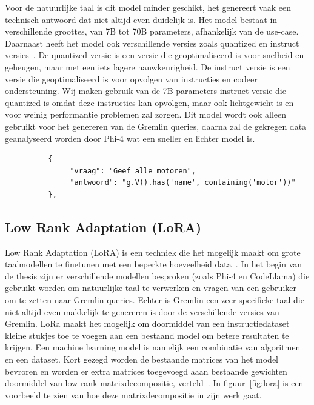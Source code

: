Voor de natuurlijke taal is dit model minder geschikt, het genereert vaak een technisch antwoord dat niet altijd even duidelijk is.
Het model bestaat in verschillende groottes, van 7B tot 70B parameters, afhankelijk van de use-case.
Daarnaast heeft het model ook verschillende versies zoals quantized en instruct versies~\autocite{HuggingFaceCodellama}.
De quantized versie is een versie die geoptimaliseerd is voor snelheid en geheugen, maar met een iets lagere nauwkeurigheid.
De instruct versie is een versie die geoptimaliseerd is voor opvolgen van instructies en codeer ondersteuning.
Wij maken gebruik van de 7B parameters-instruct versie die quantized is omdat deze instructies kan opvolgen, maar ook lichtgewicht is en voor weinig performantie problemen zal zorgen.
Dit model wordt ook alleen gebruikt voor het genereren van de Gremlin queries, daarna zal de gekregen data geanalyseerd worden door Phi-4 wat een sneller en lichter model is.

\begin{listing} [H]
     \begin{verbatim}
          {
               "vraag": "Geef alle motoren",
               "antwoord": "g.V().has('name', containing('motor'))"
          },
     \end{verbatim}
     \caption[Voorbeeld van een JSON context bestand]{\label{fig:RAGJSON}Voorbeeld JSON met vraag en query.}
\end{listing} 

\subsection{Low Rank Adaptation (LoRA)}{\label{sec:LORA}}
Low Rank Adaptation (LoRA) is een techniek die het mogelijk maakt om grote taalmodellen te finetunen met een beperkte hoeveelheid data~\autocite{Cloudflare}.
In het begin van de thesis zijn er verschillende modellen besproken (zoals Phi-4 en CodeLlama) die gebruikt worden om natuurlijke taal te verwerken en vragen van een gebruiker om te zetten naar Gremlin queries.
Echter is Gremlin een zeer specifieke taal die niet altijd even makkelijk te genereren is door de verschillende versies van Gremlin.
LoRa maakt het mogelijk om doormiddel van een instructiedataset kleine stukjes toe te voegen aan een bestaand model om betere resultaten te krijgen.
Een machine learning model is namelijk een combinatie van algoritmen en een dataset.
Kort gezegd worden de bestaande matrices van het model bevroren en worden er extra matrices toegevoegd aaan bestaande gewichten doormiddel van low-rank matrixdecompositie, verteld~\textcite{Thiyagarajan2024}.
In figuur~\ref{fig:lora} is een voorbeeld te zien van hoe deze matrixdecompositie in zijn werk gaat.


